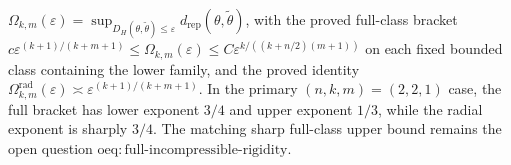 \(\Omega_{k,m}(\varepsilon)=\sup_{D_H(\theta,\widetilde\theta)\leq\varepsilon}d_{\mathrm{rep}}(\theta,\widetilde\theta)\), with the proved full-class bracket \(c\varepsilon^{(k+1)/(k+m+1)}\leq\Omega_{k,m}(\varepsilon)\leq C\varepsilon^{k/((k+n/2)(m+1))}\) on each fixed bounded class containing the lower family, and the proved identity \(\Omega_{k,m}^{\mathrm{rad}}(\varepsilon)\asymp\varepsilon^{(k+1)/(k+m+1)}\). In the primary \((n,k,m)=(2,2,1)\) case, the full bracket has lower exponent \(3/4\) and upper exponent \(1/3\), while the radial exponent is sharply \(3/4\). The matching sharp full-class upper bound remains the open question \(\mathrm{oeq:full\text{-}incompressible\text{-}rigidity}\).

